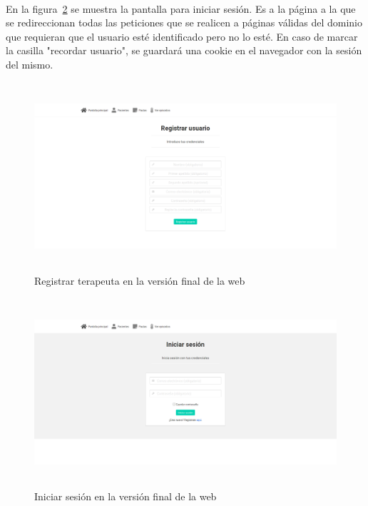 \paragraph{}
En la figura~\ref{fig:c4:impl2} se muestra la pantalla para iniciar sesión. Es a la página a la que se redireccionan todas las peticiones que se realicen a páginas válidas del dominio que requieran que el usuario esté identificado pero no lo esté. En caso de marcar la casilla "recordar usuario", se guardará una cookie en el navegador con la sesión del mismo.

\begin{figure}[h]
    \centering
    \includegraphics[height=7cm, width=\textwidth]{Imagenes/15-registrarTerapeuta.png}
    \caption[Registrar terapeuta en la versión final de la web]{Registrar terapeuta en la versión final de la web}
    \label{fig:c4:impl1}
\end{figure}

\begin{figure}[h]
    \centering
    \includegraphics[height=7cm, width=\textwidth]{Imagenes/14-iniciarSesion.png}
    \caption[Iniciar sesión en la versión final de la web]{Iniciar sesión en la versión final de la web}
    \label{fig:c4:impl2}
\end{figure}


